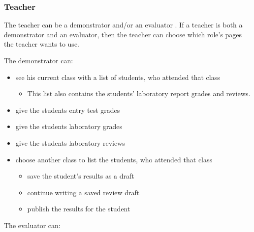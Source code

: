 \subsubsection{Teacher}

The teacher can be a demonstrator and/or an evaluator . If a teacher is both a demonstrator and an evaluator, then the teacher can choose which role's pages the teacher wants to use.


The demonstrator can:

\begin{itemize}
	\item see his current class with a list of students, who attended that class
	\begin{itemize}
		\item This list also contains the students' laboratory report grades and reviews.
	\end{itemize}
	\item give the students entry test grades
	\item give the students laboratory grades
	\item give the students laboratory reviews
	\item choose another class to list the students, who attended that class
	\begin{itemize}
		\item save the student's results as a draft
		\item continue writing a saved review draft
		\item publish the results for the student
	\end{itemize}
\end{itemize}


The evaluator can:

